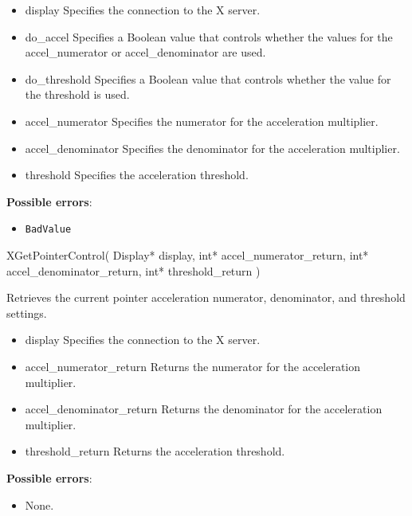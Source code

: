 \documentclass{report}
\begin{document}
\begin{itemize}
        \begin{itemize}
            \item display Specifies the connection to the X server.
            \item do\_accel Specifies a Boolean value that controls whether the values for the accel\_numerator or accel\_denominator are used.
            \item do\_threshold Specifies a Boolean value that controls whether the value for the threshold is used.
            \item accel\_numerator Specifies the numerator for the acceleration multiplier.
            \item accel\_denominator Specifies the denominator for the acceleration multiplier.
            \item threshold Specifies the acceleration threshold.
        \end{itemize}

        \textbf{Possible errors}:
        \begin{itemize}
            \item \texttt{BadValue}
        \end{itemize}

        \begin{cppcode}
        XGetPointerControl(
            Display* display,
            int* accel_numerator_return,
            int* accel_denominator_return,
            int* threshold_return
        )
        \end{cppcode}
        \bigbreak \noindent
        Retrieves the current pointer acceleration numerator, denominator, and threshold settings.

        \begin{itemize}
            \item display Specifies the connection to the X server.
            \item accel\_numerator\_return Returns the numerator for the acceleration multiplier.
            \item accel\_denominator\_return Returns the denominator for the acceleration multiplier.
            \item threshold\_return Returns the acceleration threshold.
        \end{itemize}

        \textbf{Possible errors}:
        \begin{itemize}
            \item None.
        \end{itemize}


    \end{itemize}
\end{document}
